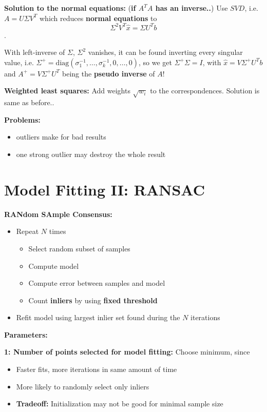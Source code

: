 \textbf{Solution to the normal equations:} (\textbf{if $A^T A$ has an inverse..}) Use $SVD$, i.e. $A = U\Sigma V^T$ which reduces \textbf{normal equations} to $$\Sigma^2 V^T \hat{x} = \Sigma U^T b$$. 

With left-inverse of $\Sigma$, $\Sigma^2$ vanishes, it can be found inverting every singular value, i.e. $\Sigma^+ = \mathrm{diag}(\sigma_1^{-1}, \dots, \sigma_k^{-1}, 0 , \dots , 0)$, so we get $\Sigma^+ \Sigma = I$, with $\hat{x} = V \Sigma^+ U^T b$ and $A^+ = V \Sigma^+ U^T$ being the \textbf{pseudo inverse} of $A$!

\textbf{Weighted least squares:} Add weights $\sqrt{w_i}$ to the correspondences. Solution is same as before..

\textbf{Problems:} \begin{itemize}
    \item outliers make for bad results
    \item one strong outlier may destroy the whole result
\end{itemize}

\section{Model Fitting II: RANSAC}

\textbf{RANdom SAmple Consensus:} \begin{itemize}
    \item {Repeat $N$ times
    \begin{itemize}
        \item Select random subset of samples
        \item Compute model
        \item Compute error between samples and model
        \item Count \textbf{inliers} by using \textbf{fixed threshold}
    \end{itemize}        
    }
    \item Refit model using largest inlier set found during the $N$ iterations
\end{itemize}

\textbf{Parameters:} 

\textbf{1: Number of points selected for model fitting:} Choose minimum, since
\begin{itemize}
    \item Faster fits, more iterations in same amount of time
    \item More likely to randomly select only inliers
    \item \textbf{Tradeoff:} Initialization may not be good for minimal sample size
\end{itemize}

